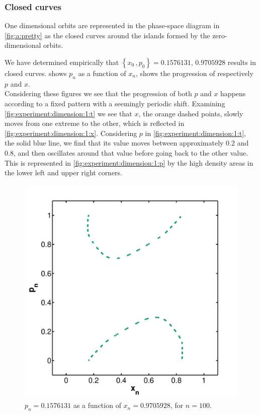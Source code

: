 \subsubsection{Closed curves}
\label{sss:experiment:a:closed}
One dimensional orbits are represented in the phase-space diagram in \cref{fig:a:pretty} as the closed curves around the islands formed by the zero-dimensional orbits.

We have determined empirically that $\left\{x_0\,, p_0 \right\} = {\num{0.1576131},\,\num{0.9705928}}$ results in closed curves.  shows $p_n$ as a function of $x_n$,  shows the progression of respectively $p$ and $x$.\\

Considering these figures we see that the progression of both $p$ and $x$ happens according to a fixed pattern with a seemingly periodic shift. Examining \cref{fig:experiment:dimension:1:t} we see that $x$, the orange dashed points, slowly moves from one extreme to the other, which is reflected in \cref{fig:experiment:dimension:1:x}. Considering $p$ in \cref{fig:experiment:dimension:1:t}, the solid blue line, we find that its value moves between approximately 0.2 and 0.8, and then oscillates around that value before going back to the other value. This is represented in \cref{fig:experiment:dimension:1:p} by the high density areas in the lower left and upper right corners.

\begin{figure}
	\centering
	\includegraphics[width=0.9\columnwidth]{./img/assignment_a_1_dim_n100}
	\caption{$p_n = \num{0.1576131}$ as a function of $x_n= \num{0.9705928}$, for $n = 100$.}
	\label{fig:experiment:a_1_n100}
\end{figure}

